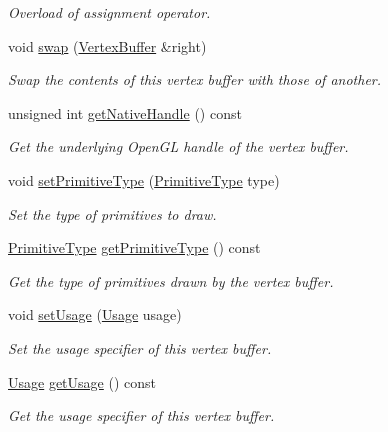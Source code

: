 \begin{DoxyCompactItemize}
\begin{DoxyCompactList}\small\item\em Overload of assignment operator. \end{DoxyCompactList}\item 
void \mbox{\hyperlink{classsf_1_1_vertex_buffer_a3954d696848dc4c921c15a6b4459c8e6}{swap}} (\mbox{\hyperlink{classsf_1_1_vertex_buffer}{Vertex\+Buffer}} \&right)
\begin{DoxyCompactList}\small\item\em Swap the contents of this vertex buffer with those of another. \end{DoxyCompactList}\item 
unsigned int \mbox{\hyperlink{classsf_1_1_vertex_buffer_a343fa0a240c91bc4203a6727fcd9b920}{get\+Native\+Handle}} () const
\begin{DoxyCompactList}\small\item\em Get the underlying Open\+GL handle of the vertex buffer. \end{DoxyCompactList}\item 
void \mbox{\hyperlink{classsf_1_1_vertex_buffer_a7c429dbef94224a86d605cf4c68aa02d}{set\+Primitive\+Type}} (\mbox{\hyperlink{group__graphics_ga5ee56ac1339984909610713096283b1b}{Primitive\+Type}} type)
\begin{DoxyCompactList}\small\item\em Set the type of primitives to draw. \end{DoxyCompactList}\item 
\mbox{\hyperlink{group__graphics_ga5ee56ac1339984909610713096283b1b}{Primitive\+Type}} \mbox{\hyperlink{classsf_1_1_vertex_buffer_a02061d85472ff69e7ad14dc72f8fcaa4}{get\+Primitive\+Type}} () const
\begin{DoxyCompactList}\small\item\em Get the type of primitives drawn by the vertex buffer. \end{DoxyCompactList}\item 
void \mbox{\hyperlink{classsf_1_1_vertex_buffer_ace40070db1fccf12a025383b23e81cad}{set\+Usage}} (\mbox{\hyperlink{classsf_1_1_vertex_buffer_a3a531528684e63ecb45edd51282f5cb7}{Usage}} usage)
\begin{DoxyCompactList}\small\item\em Set the usage specifier of this vertex buffer. \end{DoxyCompactList}\item 
\mbox{\hyperlink{classsf_1_1_vertex_buffer_a3a531528684e63ecb45edd51282f5cb7}{Usage}} \mbox{\hyperlink{classsf_1_1_vertex_buffer_a5e36f2b3955bb35648c17550a9c096e1}{get\+Usage}} () const
\begin{DoxyCompactList}\small\item\em Get the usage specifier of this vertex buffer. \end{DoxyCompactList}\end{DoxyCompactItemize}
